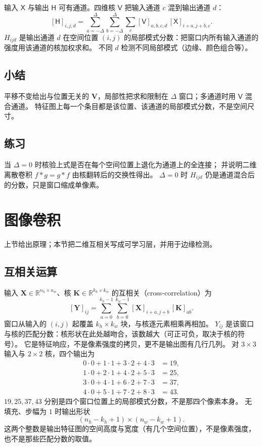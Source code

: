 输入 $\mathsf{X}$ 与输出 $\mathsf{H}$ 可有通道。四维核 $\mathsf{V}$ 把输入通道 $c$ 混到输出通道 $d$：
\[
[\mathsf{H}]_{i,j,d}
=
\sum_{a=-\Delta}^{\Delta}\sum_{b=-\Delta}^{\Delta}\sum_{c}
[\mathsf{V}]_{a,b,c,d}\,[\mathsf{X}]_{i+a,j+b,c}.
\]
$H_{ijd}$ 是输出通道 $d$ 在空间位置 $(i,j)$ 的局部模式分数：把窗口内所有输入通道的强度用该通道的核加权求和。
不同 $d$ 检测不同局部模式（边缘、颜色组合等）。

\subsection{小结}

平移不变给出与位置无关的 $\bm{V}$，局部性把求和限制在 $\Delta$ 窗口；多通道时用 $\mathsf{V}$ 混合通道。
特征图上每一个条目都是该位置、该通道的局部模式分数，不是空间尺寸。

\subsection{练习}

当 $\Delta=0$ 时核验上式是否在每个空间位置上退化为通道上的全连接；
并说明二维离散卷积 $f*g=g*f$ 由核翻转后的交换性得出。
$\Delta=0$ 时 $H_{ijd}$ 仍是通道混合后的分数，只是窗口缩成单像素。

\section{图像卷积}



上节给出原理；本节把二维互相关写成可学习层，并用于边缘检测。

\subsection{互相关运算}

输入 $\bm{X}\in\mathbb{R}^{n_h\times n_w}$、核 $\bm{K}\in\mathbb{R}^{k_h\times k_w}$ 的互相关（cross-correlation）为
\[
[\bm{Y}]_{ij}
=
\sum_{a=0}^{k_h-1}\sum_{b=0}^{k_w-1}
[\bm{X}]_{i+a,j+b}\,[\bm{K}]_{ab}.
\]
窗口从输入的 $(i,j)$ 起覆盖 $k_h\times k_w$ 块，与核逐元素相乘再相加。
$Y_{ij}$ 是该窗口与核的匹配分数：核形状在此处越吻合，该数越大（可正可负，取决于核的符号）。
它是特征响应，不是像素强度的拷贝，更不是输出图有几行几列。
对 $3\times 3$ 输入与 $2\times 2$ 核，四个输出为
\begin{align*}
0\cdot 0+1\cdot 1+3\cdot 2+4\cdot 3&=19,\\
1\cdot 0+2\cdot 1+4\cdot 2+5\cdot 3&=25,\\
3\cdot 0+4\cdot 1+6\cdot 2+7\cdot 3&=37,\\
4\cdot 0+5\cdot 1+7\cdot 2+8\cdot 3&=43.
\end{align*}
$19,25,37,43$ 分别是四个窗口位置上的局部模式分数，不是那四个像素本身。
无填充、步幅为 $1$ 时输出形状
\[
(n_h-k_h+1)\times(n_w-k_w+1).
\]
这两个整数是输出特征图的空间高度与宽度（有几个空间位置），不是像素强度，也不是那些匹配分数的取值。

